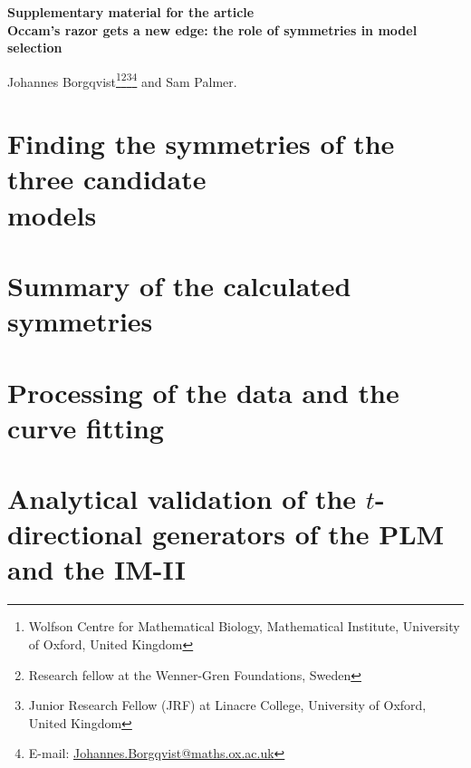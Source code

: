 \documentclass[12pt]{article}
\begin{document}
\begin{titlepage}
  \Large \textbf{Supplementary material for the article}\\[1cm]
  \Huge \textbf{Occam's razor gets a new edge: the role of symmetries in model selection}\\[1cm]\normalsize

 \vspace{3.0cm}
        \setcounter{footnote}{1}
       Johannes Borgqvist\footnote{\label{Oxford}Wolfson Centre for Mathematical Biology, Mathematical Institute, University of Oxford, United Kingdom}\footnote{\label{WennerGren} Research fellow at the Wenner-Gren Foundations, Sweden}\footnote{\label{Linacre} Junior Research Fellow (JRF) at Linacre College, University of Oxford, United Kingdom}\footnote{E-mail: \url{Johannes.Borgqvist@maths.ox.ac.uk}} and Sam Palmer.


  
\end{titlepage}

       \renewcommand*{\thefootnote}{\arabic{footnote}}
        \setcounter{footnote}{0}
\tableofcontents
\listoffigures
\listoftables
\newpage




\section{Finding the symmetries of the three candidate\\models}



\section{Summary of the calculated symmetries}



\section{Processing of the data and the curve fitting}




\section{Analytical validation of the $t$-directional generators of the PLM and the IM-II}
\end{document}
